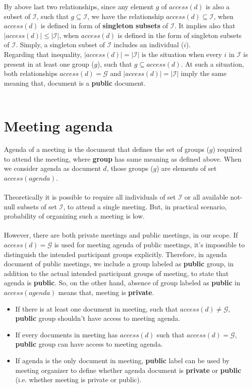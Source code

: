 \documentclass{article}
\begin{document}
By above last two relationships, since any element $g$ of $access(d)$ is also a subset of $\mathcal{I}$, such that $g \subseteq \mathcal{I}$, we have the relationship $access(d) \subseteq \mathcal{I}$, when $access(d)$ is defined in form of \textbf{singleton subsets} of $\mathcal{I}$. It implies also that $|access(d)| \leq |\mathcal{I}|$, when $access(d)$ is defined in the form of singleton subsets of $\mathcal{I}$. Simply, a singleton subset of $\mathcal{I}$ includes an individual ($i$).  \\
Regarding that inequality, $|access(d)| = |\mathcal{I}|$ is the situation when every $i$ in $\mathcal{I}$ is present in at least one group ($g$), such that $g \subseteq access(d)$. At such a situation, both relationships $access(d) = \mathcal{G}$ and $|access(d)| = |\mathcal{I}|$ imply the same meaning that, document is a \textbf{public} document.\\ \\

\section{Meeting agenda}
\noindent
Agenda of a meeting is the document that defines the set of groups ($g$) required to attend the meeting, where \textbf{group} has same meaning as defined above.
When we consider agenda as document $d$, those groups ($g$) are elements of set $access(agenda)$.\\ \\
Theoretically it is possible to require all individuals of set $\mathcal{I}$ or all available not-null subsets of set $\mathcal{I}$, to attend a single meeting. But, in practical scenario, probability of organizing such a meeting is low. \\ \\

However, there are both private meetings and public meetings, in our scope. If $access(d) = \mathcal{G}$ is used for meeting agenda of public meetings, it's impossible to distinguish the intended participant groups explicitly. Therefore, in agenda document of public meetings, we include a group labeled as \textbf{public} group, in addition to the actual intended participant groups of meeting, to state that agenda is \textbf{public}. So, on the other hand, absence of group labeled as \textbf{public} in $access(agenda)$ means that, meeting is \textbf{private}.
\begin{itemize}
    \item If there is at least one document in meeting, such that $access(d) \ne \mathcal{G}$, \textbf{public} group shouldn't have access to meeting agenda.
    \item If every documents in meeting has $access(d)$ such that $access(d) = \mathcal{G}$, \textbf{public} group can have access to meeting agenda.
    \item If agenda is the only document in meeting, \textbf{public} label can be used by meeting organizer to define whether agenda document is \textbf{private} or \textbf{public} (i.e. whether meeting is private or public).
\end{itemize}
\end{document}
